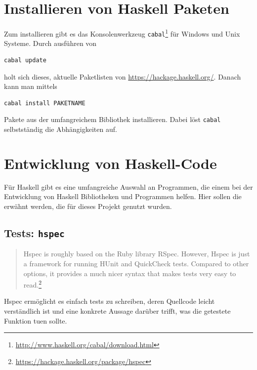 \section{Installieren von Haskell Paketen}
Zum installieren gibt es das Konsolenwerkzeug
\texttt{cabal}\footnote{\url{http://www.haskell.org/cabal/download.html}} für
Windows und Unix Systeme.
Durch ausführen von
\begin{lstlisting}[language=bash 
                  ,numbers=none
                  ,backgroundcolor=\color{lightgray}]
cabal update
\end{lstlisting}
holt sich dieses, aktuelle Paketlisten von
\url{https://hackage.haskell.org/}. Danach kann man mittels
\begin{lstlisting}[language=bash
                  ,numbers=none
                  ,backgroundcolor=\color{lightgray}]
cabal install PAKETNAME
\end{lstlisting}
Pakete aus der umfangreichem Bibliothek installieren.
Dabei löst \texttt{cabal} selbstständig die Abhängigkeiten auf.

\section{Entwicklung von Haskell-Code}
Für Haskell gibt es eine umfangreiche Auswahl an Programmen, die einem bei der
Entwicklung von Haskell Bibliotheken und Programmen helfen. Hier sollen die
erwähnt werden, die für dieses Projekt genutzt wurden.

\subsection{Tests: \texttt{hspec}}
\begin{quote}
  Hspec is roughly based on the Ruby library RSpec. However, Hspec is just a
  framework for running HUnit and QuickCheck tests. Compared to other options,
  it provides a much nicer syntax that makes tests very easy to
  read.\footnote{\url{https://hackage.haskell.org/package/hspec}}
\end{quote}
Hspec ermöglicht es einfach tests zu schreiben, deren Quellcode leicht
verständlich ist und eine konkrete Aussage darüber trifft, was die getestete
Funktion tuen sollte.

